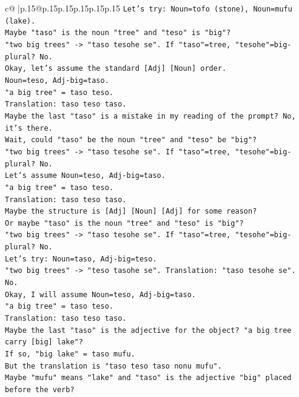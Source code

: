 \documentclass{article}
\begin{document}
{\begin{supertabular}{c@{$\;$}|p{.15\linewidth}@{}p{.15\linewidth}p{.15\linewidth}p{.15\linewidth}p{.15\linewidth}p{.15\linewidth}}
{{{\texttt{Let's try: Noun=tofo (stone), Noun=mufu (lake).} \\
\texttt{Maybe "taso" is the noun "tree" and "teso" is "big"?} \\
\texttt{"two big trees" {-}> "taso tesohe se". If "taso"=tree, "tesohe"=big{-}plural? No.} \\
\texttt{Okay, let's assume the standard {[}Adj{]} {[}Noun{]} order.} \\
\texttt{Noun=teso, Adj{-}big=taso.} \\
\texttt{"a big tree" = taso teso.} \\
\texttt{Translation: taso teso taso.} \\
\texttt{Maybe the last "taso" is a mistake in my reading of the prompt? No, it's there.} \\
\texttt{Wait, could "taso" be the noun "tree" and "teso" be "big"?} \\
\texttt{"two big trees" {-}> "taso tesohe se". If "taso"=tree, "tesohe"=big{-}plural? No.} \\
\texttt{Let's assume Noun=teso, Adj{-}big=taso.} \\
\texttt{"a big tree" = taso teso.} \\
\texttt{Translation: taso teso taso.} \\
\texttt{Maybe the structure is {[}Adj{]} {[}Noun{]} {[}Adj{]} for some reason?} \\
\texttt{Or maybe "taso" is the noun "tree" and "teso" is "big"?} \\
\texttt{"two big trees" {-}> "taso tesohe se". If "taso"=tree, "tesohe"=big{-}plural? No.} \\
\texttt{Let's try: Noun=taso, Adj{-}big=teso.} \\
\texttt{"two big trees" {-}> "teso tasohe se". Translation: "taso tesohe se". No.} \\
\texttt{Okay, I will assume Noun=teso, Adj{-}big=taso.} \\
\texttt{"a big tree" = taso teso.} \\
\texttt{Translation: taso teso taso.} \\
\texttt{Maybe the last "taso" is the adjective for the object? "a big tree carry {[}big{]} lake"?} \\
\texttt{If so, "big lake" = taso mufu.} \\
\texttt{But the translation is "taso teso taso nonu mufu".} \\
\texttt{Maybe "mufu" means "lake" and "taso" is the adjective "big" placed before the verb?} \\
}}}
\end{supertabular}}
\end{document}
